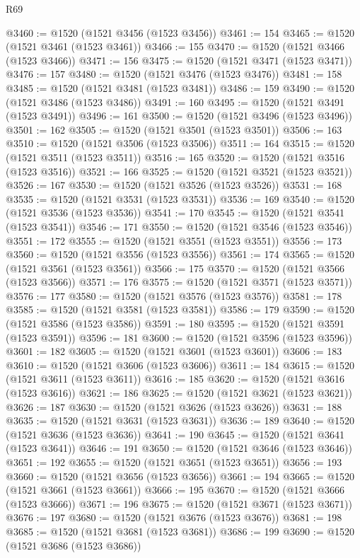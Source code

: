 \begin{lexlean}{R69}
\begin{coremodule}
{@3460 := @1520 (@1521 @3456 (@1523 @3456))
@3461 := 154
@3465 := @1520 (@1521 @3461 (@1523 @3461))
@3466 := 155
@3470 := @1520 (@1521 @3466 (@1523 @3466))
@3471 := 156
@3475 := @1520 (@1521 @3471 (@1523 @3471))
@3476 := 157
@3480 := @1520 (@1521 @3476 (@1523 @3476))
@3481 := 158
@3485 := @1520 (@1521 @3481 (@1523 @3481))
@3486 := 159
@3490 := @1520 (@1521 @3486 (@1523 @3486))
@3491 := 160
@3495 := @1520 (@1521 @3491 (@1523 @3491))
@3496 := 161
@3500 := @1520 (@1521 @3496 (@1523 @3496))
@3501 := 162
@3505 := @1520 (@1521 @3501 (@1523 @3501))
@3506 := 163
@3510 := @1520 (@1521 @3506 (@1523 @3506))
@3511 := 164
@3515 := @1520 (@1521 @3511 (@1523 @3511))
@3516 := 165
@3520 := @1520 (@1521 @3516 (@1523 @3516))
@3521 := 166
@3525 := @1520 (@1521 @3521 (@1523 @3521))
@3526 := 167
@3530 := @1520 (@1521 @3526 (@1523 @3526))
@3531 := 168
@3535 := @1520 (@1521 @3531 (@1523 @3531))
@3536 := 169
@3540 := @1520 (@1521 @3536 (@1523 @3536))
@3541 := 170
@3545 := @1520 (@1521 @3541 (@1523 @3541))
@3546 := 171
@3550 := @1520 (@1521 @3546 (@1523 @3546))
@3551 := 172
@3555 := @1520 (@1521 @3551 (@1523 @3551))
@3556 := 173
@3560 := @1520 (@1521 @3556 (@1523 @3556))
@3561 := 174
@3565 := @1520 (@1521 @3561 (@1523 @3561))
@3566 := 175
@3570 := @1520 (@1521 @3566 (@1523 @3566))
@3571 := 176
@3575 := @1520 (@1521 @3571 (@1523 @3571))
@3576 := 177
@3580 := @1520 (@1521 @3576 (@1523 @3576))
@3581 := 178
@3585 := @1520 (@1521 @3581 (@1523 @3581))
@3586 := 179
@3590 := @1520 (@1521 @3586 (@1523 @3586))
@3591 := 180
@3595 := @1520 (@1521 @3591 (@1523 @3591))
@3596 := 181
@3600 := @1520 (@1521 @3596 (@1523 @3596))
@3601 := 182
@3605 := @1520 (@1521 @3601 (@1523 @3601))
@3606 := 183
@3610 := @1520 (@1521 @3606 (@1523 @3606))
@3611 := 184
@3615 := @1520 (@1521 @3611 (@1523 @3611))
@3616 := 185
@3620 := @1520 (@1521 @3616 (@1523 @3616))
@3621 := 186
@3625 := @1520 (@1521 @3621 (@1523 @3621))
@3626 := 187
@3630 := @1520 (@1521 @3626 (@1523 @3626))
@3631 := 188
@3635 := @1520 (@1521 @3631 (@1523 @3631))
@3636 := 189
@3640 := @1520 (@1521 @3636 (@1523 @3636))
@3641 := 190
@3645 := @1520 (@1521 @3641 (@1523 @3641))
@3646 := 191
@3650 := @1520 (@1521 @3646 (@1523 @3646))
@3651 := 192
@3655 := @1520 (@1521 @3651 (@1523 @3651))
@3656 := 193
@3660 := @1520 (@1521 @3656 (@1523 @3656))
@3661 := 194
@3665 := @1520 (@1521 @3661 (@1523 @3661))
@3666 := 195
@3670 := @1520 (@1521 @3666 (@1523 @3666))
@3671 := 196
@3675 := @1520 (@1521 @3671 (@1523 @3671))
@3676 := 197
@3680 := @1520 (@1521 @3676 (@1523 @3676))
@3681 := 198
@3685 := @1520 (@1521 @3681 (@1523 @3681))
@3686 := 199
@3690 := @1520 (@1521 @3686 (@1523 @3686))
}
\end{coremodule}
\end{lexlean}

